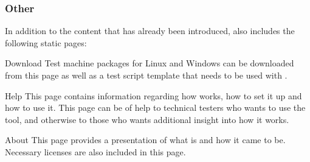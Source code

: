 \subsubsection{Other}



In addition to the content that has already been introduced, \toolname \space also includes the following static pages:

\begin{Description}
    \item [Download] Test machine packages for Linux and Windows can be downloaded from this page as well as a test script template that needs to be used with \toolname.
    \item [Help] This page contains information regarding how \toolname \space works, how to set it up and how to use it. This page can be of help to technical testers who wants to use the tool, and otherwise to those who wants additional insight into how it works.
    \item [About] This page provides a presentation of what \toolname \space is and how it came to be. Necessary licenses are also included in this page.
\end{Description}